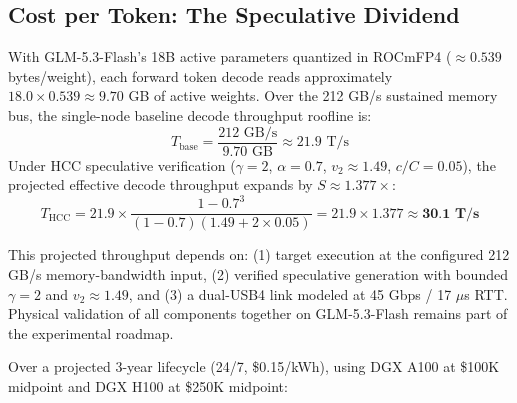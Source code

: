 \documentclass[11pt,a4paper]{article}
\begin{document}
\subsection{Cost per Token: The Speculative Dividend}

With GLM-5.3-Flash's 18B active parameters quantized in ROCmFP4 ($\approx 0.539$ bytes/weight), each forward token decode reads approximately $18.0 \times 0.539 \approx 9.70$ GB of active weights. Over the 212 GB/s sustained memory bus, the single-node baseline decode throughput roofline is:
\begin{equation}
    T_{\text{base}} = \frac{212 \text{ GB/s}}{9.70 \text{ GB}} \approx 21.9 \text{ T/s}
\end{equation}
Under HCC speculative verification ($\gamma = 2$, $\alpha = 0.7$, $v_2 \approx 1.49$, $c/C = 0.05$), the projected effective decode throughput expands by $S \approx 1.377\times$:
\begin{equation}
    T_{\text{HCC}} = 21.9 \times \frac{1 - 0.7^{3}}{(1-0.7)(1.49 + 2 \times 0.05)} = 21.9 \times 1.377 \approx \textbf{30.1 T/s}
\end{equation}

\noindent This projected throughput depends on: (1) target execution at the configured 212 GB/s memory-bandwidth input, (2) verified speculative generation with bounded $\gamma=2$ and $v_2 \approx 1.49$, and (3) a dual-USB4 link modeled at 45 Gbps / 17 $\mu$s RTT. Physical validation of all components together on GLM-5.3-Flash remains part of the experimental roadmap.

Over a projected 3-year lifecycle (24/7, \$0.15/kWh), using DGX A100 at \$100K midpoint and DGX H100 at \$250K midpoint:
\end{document}
